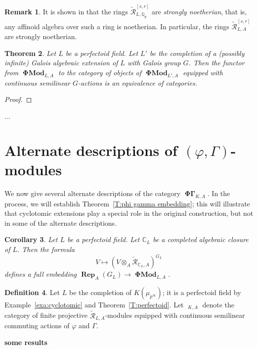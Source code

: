 \documentclass[12pt]{amsart}
\newtheorem{theorem}{Theorem}[section]
\newtheorem{cor}[theorem]{Corollary}
\theoremstyle{definition}
\newtheorem{defn}[theorem]{Definition}
\newtheorem{remark}[theorem]{Remark}
\numberwithin{equation}{theorem}
\newcommand{\CC}{\mathbb{C}}
\newcommand{\QQ}{\mathbb{Q}}
\newcommand{\calR}{\mathcal{R}}
\DeclareMathOperator{\PhiGamma}{\mathbf{\Phi \Gamma}}
\DeclareMathOperator{\PhiGammatilde}{\widetilde{\mathbf{\Phi \Gamma}}}
\DeclareMathOperator{\PhiMod}{\mathbf{\Phi Mod}}
\DeclareMathOperator{\Rep}{\mathbf{Rep}}
\begin{document}
\begin{remark}
It is shown in \cite{kedlaya-noetherian} that the rings $\tilde{\calR}^{[s,r]}_{L,\QQ_p}$ are \emph{strongly noetherian}, that is, any affinoid algebra over such a ring is noetherian. In particular, the rings $\tilde{\calR}^{[s,r]}_{L,A}$ are strongly noetherian.
\end{remark}

\begin{theorem}
Let $L$ be a perfectoid field. Let $L'$ be the completion of a (possibly infinite) Galois algebraic extension of $L$ with Galois group $G$. Then the functor from
$\PhiMod_{L,A}$ to the category of objects of $\PhiMod_{L',A}$ equipped with continuous semilinear $G$-actions is an equivalence of categories.
\end{theorem}
\begin{proof}
\end{proof}



...

\section{Alternate descriptions of \texorpdfstring{$(\varphi, \Gamma)$}{(phi, Gamma)}-modules}
\label{sec:alternate}

We now give several alternate descriptions of the category $\PhiGamma_{K,A}$. In the process, we will establish Theorem~\ref{T:phi gamma embedding}; this will illustrate that cyclotomic extensions play a special role in the original construction, but not in some of
the alternate descriptions.

\begin{cor}
Let $L$ be a perfectoid field.
Let $\CC_L$ be a completed algebraic closure of $L$. Then the formula 
\[
V \mapsto (V \otimes_A \tilde{\calR}_{\CC_L, A})^{G_L}
\]
defines a full embedding $\Rep_A(G_L) \to \PhiMod_{L,A}$.
\end{cor}

\begin{defn}
Let $L$ be the completion of $K(\mu_{p^\infty})$; it is a perfectoid field by
Example~\ref{exa:cyclotomic} and Theorem~\ref{T:perfectoid}.
Let $\PhiGammatilde_{K,A}$ denote the category of finite projective $\tilde{\calR}_{L,A}$-modules equipped with continuous semilinear commuting actions of $\varphi$ and $\Gamma$.
\end{defn}

\textbf{some results}
\end{document}
